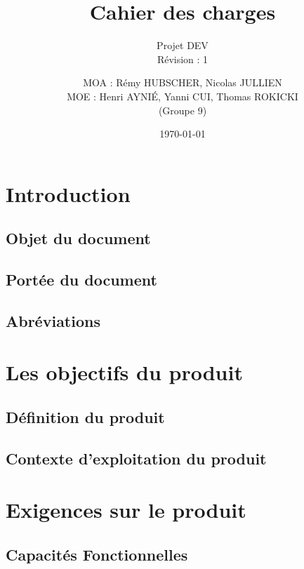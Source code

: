 \documentclass[majeure,gl]{tb}
\date{\today}
\title[Cahier des charges]{Cahier des charges}
\subtitle{Projet DEV \\ Révision : 1}
\author{MOA : Rémy HUBSCHER, Nicolas JULLIEN \\ MOE : Henri AYNIÉ, Yanni CUI, Thomas ROKICKI \\ \small(Groupe 9)}
\begin{document}
\maketitle

\clearpage
\renewcommand\contentsname{Sommaire}
\tableofcontents


\clearpage






\clearpage
\section{Introduction}

\subsection{Objet du document}


\subsection{Portée du document}


\subsection{Abréviations}

\section{Les objectifs du produit}

\subsection{Définition du produit}

\subsection{Contexte d'exploitation du produit}

\section{Exigences sur le produit}
\label{sec:exigence}

\subsection{Capacités Fonctionnelles}
\label{fonc}
\end{document}
